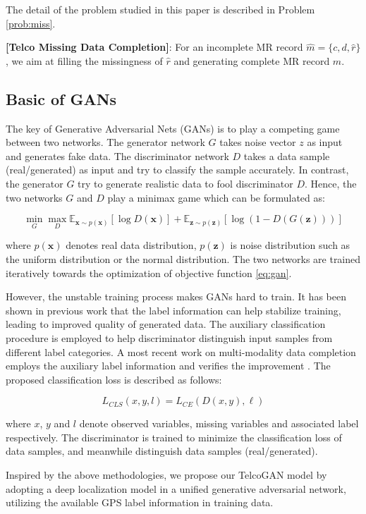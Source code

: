 The detail of the problem studied in this paper is described in Problem \ref{prob:miss}.

\begin{problem}\label{prob:miss}
  \textbf{[Telco Missing Data Completion]}: For an incomplete MR record $\hat{m}=\{c,d,\hat{r}\}$, we aim at filling the missingness of $\hat{r}$ and generating complete MR record $m$.
\end{problem}

\subsection{Basic of GANs}
The key of Generative Adversarial Nets (GANs) \cite{DBLP:conf/nips/GoodfellowPMXWOCB14} is to play a competing game between two networks. The generator network $G$ takes noise vector $z$ as input and generates fake data. The discriminator network $D$ takes a data sample (real/generated) as input and try to classify the sample accurately. In contrast, the generator $G$ try to generate realistic data to fool discriminator $D$. Hence, the two networks $G$ and $D$ play a minimax game which can be formulated as:

\begin{equation}\label{eq:gan}
  \min\limits_G \max\limits_D \mathbb{E}_{\textbf{x}\sim p(\textbf{x})}[\log D(\textbf{x})]+\mathbb{E}_{\textbf{z}\sim p( \textbf{z})}[\log(1-D(G(\textbf{z})))]
\end{equation}

where $p(\textbf{x})$ denotes real data distribution, $p(\textbf{z})$ is noise distribution such as the uniform distribution or the normal distribution. The two networks are trained iteratively towards the optimization of objective function \ref{eq:gan}.

However, the unstable training process makes GANs hard to train. It has been shown in previous work \cite{DBLP:conf/icml/OdenaOS17} that the label information can help stabilize training, leading to improved quality of generated data. The auxiliary classification procedure is employed to help discriminator distinguish input samples from different label categories. A most recent work on multi-modality data completion employs the auxiliary label information and verifies the improvement \cite{DBLP:conf/kdd/CaiWGSJ18}. The proposed classification loss is described as follows:

\begin{equation}\label{eq:multi}
  L_{CLS}(x, y, l)=L_{CE}(D(x,y),\ell)
\end{equation}

where $x$, $y$ and $l$ denote observed variables, missing variables and associated label respectively. The discriminator is trained to minimize the classification loss of data samples, and meanwhile distinguish data samples (real/generated).

Inspired by the above methodologies, we propose our TelcoGAN model by adopting a deep localization model in a unified generative adversarial network, utilizing the available GPS label information in training data.
